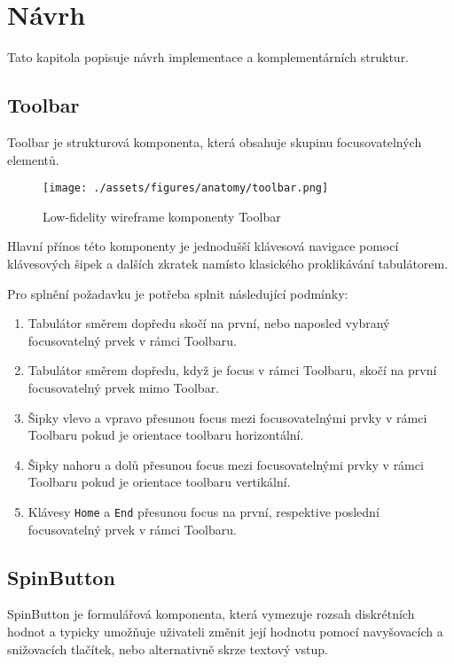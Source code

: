 \chapter{Návrh}

Tato kapitola popisuje návrh implementace a komplementárních struktur.

\section{Toolbar}

Toolbar je strukturová komponenta, která obsahuje skupinu focusovatelných elementů.

\begin{figure}[htp]
    \centering
    \texttt{[image: ./assets/figures/anatomy/toolbar.png]}
    \captionsetup{justification=centering}
    \caption{Low-fidelity wireframe komponenty Toolbar}
\end{figure}

Hlavní přínos této komponenty je jednodušší klávesová navigace pomocí klávesových šipek a dalších zkratek namísto klasického proklikávání tabulátorem.

Pro splnění požadavku \hyperref[ofr11]{} je potřeba splnit následující podmínky:

\begin{enumerate}
    \item Tabulátor směrem dopředu skočí na první, nebo naposled vybraný focusovatelný prvek v rámci Toolbaru.
    \item Tabulátor směrem dopředu, když je focus v rámci Toolbaru, skočí na první focusovatelný prvek mimo Toolbar.
    \item Šipky vlevo a vpravo přesunou focus mezi focusovatelnými prvky v rámci Toolbaru pokud je orientace toolbaru horizontální.
    \item Šipky nahoru a dolů přesunou focus mezi focusovatelnými prvky v rámci Toolbaru pokud je orientace toolbaru vertikální.
    \item Klávesy \texttt{Home} a \texttt{End} přesunou focus na první, respektive poslední focusovatelný prvek v rámci Toolbaru.
\end{enumerate}

\section{SpinButton}

SpinButton je formulářová komponenta, která vymezuje rozsah diskrétních hodnot a typicky umožňuje uživateli změnit její hodnotu pomocí navyšovacích a snižovacích tlačítek, nebo alternativně skrze textový vstup.

